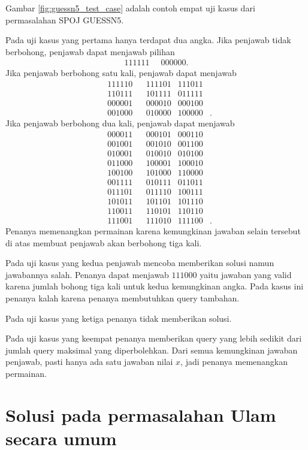 Gambar \ref{fig:guessn5_test_case} adalah contoh empat uji kasus dari permasalahan SPOJ GUESSN5.

Pada uji kasus yang pertama hanya terdapat dua angka. Jika penjawab tidak berbohong, penjawab dapat menjawab pilihan
\begin{align*}
111111 \;\;& 000000\textrm{.}
\end{align*}
Jika penjawab berbohong satu kali, penjawab dapat menjawab
\begin{align*}
& 111110 & & 111101 & 111011 \\
& 110111 & & 101111 & 011111 \\
& 000001 & & 000010 & 000100 \\
& 001000 & & 010000 & 100000 &\textrm{.}
\end{align*}
Jika penjawab berbohong dua kali, penjawab dapat menjawab
\begin{align*}
& 000011 & & 000101 & 000110 \\
& 001001 & & 001010 & 001100 \\
& 010001 & & 010010 & 010100 \\
& 011000 & & 100001 & 100010 \\
& 100100 & & 101000 & 110000 \\
& 001111 & & 010111 & 011011 \\
& 011101 & & 011110 & 100111 \\
& 101011 & & 101101 & 101110 \\
& 110011 & & 110101 & 110110 \\
& 111001 & & 111010 & 111100 &\textrm{.}
\end{align*}
Penanya memenangkan permainan karena kemungkinan jawaban selain tersebut di atas membuat penjawab akan berbohong tiga kali.

Pada uji kasus yang kedua penjawab mencoba memberikan solusi namun jawabannya salah. Penanya dapat menjawab $111000$ yaitu jawaban yang valid karena jumlah bohong tiga kali untuk kedua kemungkinan angka. Pada kasus ini penanya kalah karena penanya membutuhkan query tambahan.

Pada uji kasus yang ketiga penanya tidak memberikan solusi.

Pada uji kasus yang keempat penanya memberikan query yang lebih sedikit dari jumlah query maksimal yang diperbolehkan. Dari semua kemungkinan jawaban penjawab, pasti hanya ada satu jawaban nilai $x$, jadi penanya memenangkan permainan.


\section{Solusi pada permasalahan Ulam secara umum}

